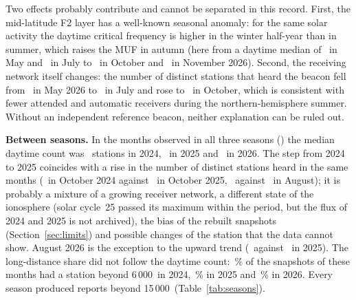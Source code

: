 \documentclass[10pt,a4paper]{article}
\begin{document}
Two effects probably contribute and cannot be separated in this record. First, the mid-latitude F2 layer has a well-known seasonal anomaly: for the same solar activity the daytime critical frequency is higher in the winter half-year than in summer, which raises the MUF in autumn (here from a daytime median of \monmufCACGAF\MHz\ in May and \monmufCACGAH\MHz\ in July to \monmufCACGBA\MHz\ in October and \monmufCACGBB\MHz\ in November 2026). Second, the receiving network itself changes: the number of distinct stations that heard the beacon fell from \monuniqCACGAF\ in May 2026 to \monuniqCACGAH\ in July and rose to \monuniqCACGBA\ in October, which is consistent with fewer attended and automatic receivers during the northern-hemisphere summer. Without an independent reference beacon, neither explanation can be ruled out.

\textbf{Between seasons.} In the months observed in all three seasons (\commonNames) the median daytime count was \coCACEMed\ stations in 2024, \coCACFMed\ in 2025 and \coCACGMed\ in 2026. The step from 2024 to 2025 coincides with a rise in the number of distinct stations heard in the same months (\monuniqCACEBA\ in October 2024 against \monuniqCACFBA\ in October 2025, \monuniqCACEAI\ against \monuniqCACFAI\ in August); it is probably a mixture of a growing receiver network, a different state of the ionosphere (solar cycle~25 passed its maximum within the period, but the flux of 2024 and 2025 is not archived), the bias of the rebuilt snapshots (Section~\ref{sec:limits}) and possible changes of the station that the data cannot show. August 2026 is the exception to the upward trend (\monCACGAI\ against \monCACFAI\ in 2025). The long-distance share did not follow the daytime count: \coCACEDx\,\% of the snapshots of these months had a station beyond 6\,000\km\ in 2024, \coCACFDx\,\% in 2025 and \coCACGDx\,\% in 2026. Every season produced reports beyond 15\,000\km\ (Table~\ref{tab:seasons}).




\end{document}
